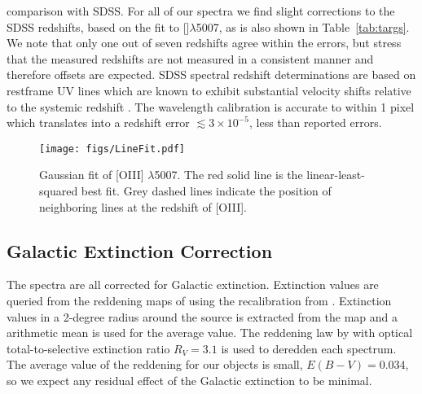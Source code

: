 \documentclass{aa}    %
\newcommand{\figlabel}[1]{\label{fig:#1}}
\newcommand{\Tab}[1]{Table~\ref{tab:#1}}
\newcommand{\tab}[1]{\Tab{#1}}
\newcommand{\sectlabel}[1]{\label{sect:#1}}
\newcommand{\oiii}{[\ion{O}{iii}]$\lambda$5007}
\begin{document}
comparison with SDSS. For all of our spectra we find slight
corrections to the SDSS redshifts, based on the fit to \oiii, as is
also shown in \tab{targs}. We note that only one out of seven
redshifts agree within the errors, but stress that the measured
redshifts are not measured in a consistent manner and therefore
offsets are expected. SDSS spectral redshift determinations are based
on restframe UV lines which are known to exhibit substantial velocity
shifts relative to the systemic redshift \citep{Tytler1992,
  Hewett2010}. The wavelength calibration is accurate to within 1
pixel \citep{Kruhler2015} which translates into a redshift error
$\lesssim 3\times 10^{-5}$, less than reported errors.

\begin{figure}[t!]
  \centering
  \texttt{[image: figs/LineFit.pdf]}
  \caption[]{Gaussian fit of [OIII] $\lambda$5007. The red solid line is the
linear-least-squared best fit. Grey dashed lines indicate the
position of neighboring lines at the redshift of [OIII].}
  \figlabel{linefit}
\end{figure}




\subsection{Galactic Extinction Correction} \sectlabel{extinct}

The spectra are all corrected for Galactic extinction. Extinction
values are queried from the reddening maps of \citet{Schlegel1998}
using the recalibration from \citet{Schlafly2011}. Extinction values
in a 2-degree radius around the source is extracted from the map and a
arithmetic mean is used for the average value. The reddening law by
\citet{Fitzpatrick1999} with optical total-to-selective extinction
ratio $R_V = 3.1$ is used to deredden each spectrum. The average value
of the reddening for our objects is small, $E(B-V) = 0.034$, so we
expect any residual effect of the Galactic extinction to be minimal.





\end{document}
